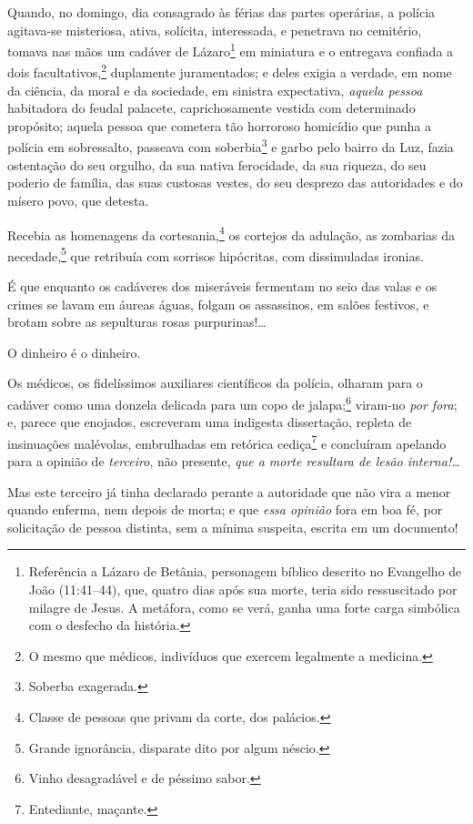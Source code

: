 {Quando, no domingo, dia consagrado às férias das partes operárias, a
polícia agitava-se misteriosa, ativa, solícita, interessada, e
penetrava no cemitério, tomava nas mãos um cadáver de Lázaro\footnote{
  Referência a Lázaro de Betânia, personagem bíblico descrito no \label{lazaro}
  Evangelho de João (11:41--44), que, quatro dias após sua morte, teria
  sido ressuscitado por milagre de Jesus. A metáfora, como se verá,
  ganha uma forte carga simbólica com o desfecho da história.} em miniatura e o entregava confiada a dois
facultativos,\footnote{O mesmo que médicos, indivíduos que exercem
  legalmente a medicina.} duplamente juramentados; e deles exigia a
verdade, em nome da ciência, da moral e da sociedade, em sinistra
expectativa, \emph{aquela pessoa} habitadora do feudal palacete,
caprichosamente vestida com determinado propósito; aquela pessoa que
cometera tão horroroso homicídio que punha a polícia em sobressalto,
passeava com soberbia\footnote{Soberba exagerada.} e garbo pelo bairro
da Luz, fazia ostentação do seu orgulho, da sua nativa ferocidade, da
sua riqueza, do seu poderio de família, das suas custosas vestes, do seu
desprezo das autoridades e do mísero povo, que detesta.

Recebia as homenagens da cortesania,\footnote{Classe de pessoas que
  privam da corte, dos palácios.} os cortejos da adulação, as zombarias
da necedade,\footnote{Grande ignorância, disparate dito por algum
  néscio.} que retribuía com sorrisos hipócritas, com dissimuladas
ironias.

É que enquanto os cadáveres dos miseráveis fermentam no seio das valas e
os crimes se lavam em áureas águas, folgam os assassinos, em salões
festivos, e brotam sobre as sepulturas rosas purpurinas!\ldots{}

O dinheiro é o dinheiro.

Os médicos, os fidelíssimos auxiliares científicos da polícia, olharam
para o cadáver como uma donzela delicada para um copo de
jalapa;\footnote{Vinho desagradável e de péssimo sabor.} viram-no
\emph{por fora}; e, parece que enojados, escreveram uma indigesta
dissertação, repleta de insinuações malévolas, embrulhadas em retórica
cediça\footnote{Entediante, maçante.} e concluíram apelando para a
opinião de \emph{terceiro}, não presente, \emph{que a morte resultara de
lesão interna!\ldots{}}

Mas este terceiro já tinha declarado perante a autoridade que não vira a
menor quando enferma, nem depois de morta; e que \emph{essa opinião}
fora em boa fé, por solicitação de pessoa distinta, sem a mínima
suspeita, escrita em um documento!

}
